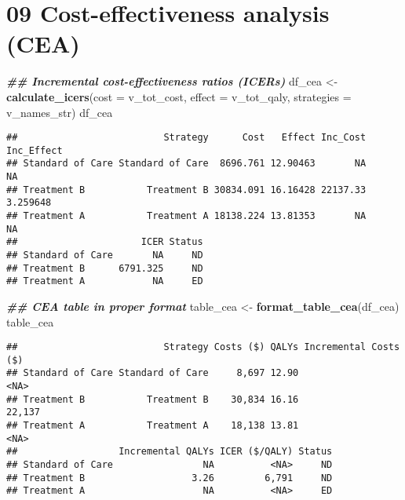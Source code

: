 \documentclass[
]{article}
\newenvironment{Shaded}{\begin{snugshade}}{\end{snugshade}}
\newcommand{\AttributeTok}[1]{\textcolor[rgb]{0.13,0.29,0.53}{#1}}
\newcommand{\DocumentationTok}[1]{\textcolor[rgb]{0.56,0.35,0.01}{\textbf{\textit{#1}}}}
\newcommand{\FunctionTok}[1]{\textcolor[rgb]{0.13,0.29,0.53}{\textbf{#1}}}
\newcommand{\NormalTok}[1]{#1}
\newcommand{\OtherTok}[1]{\textcolor[rgb]{0.56,0.35,0.01}{#1}}
\begin{document}
\hypertarget{cost-effectiveness-analysis-cea}{%
\section{09 Cost-effectiveness analysis
(CEA)}\label{cost-effectiveness-analysis-cea}}

\begin{Shaded}
\begin{Highlighting}[]
\DocumentationTok{\#\# Incremental cost{-}effectiveness ratios (ICERs) }
\NormalTok{df\_cea }\OtherTok{\textless{}{-}} \FunctionTok{calculate\_icers}\NormalTok{(}\AttributeTok{cost       =}\NormalTok{ v\_tot\_cost, }
                          \AttributeTok{effect     =}\NormalTok{ v\_tot\_qaly,}
                          \AttributeTok{strategies =}\NormalTok{ v\_names\_str)}
\NormalTok{df\_cea}
\end{Highlighting}
\end{Shaded}

\begin{verbatim}
##                          Strategy      Cost   Effect Inc_Cost Inc_Effect
## Standard of Care Standard of Care  8696.761 12.90463       NA         NA
## Treatment B           Treatment B 30834.091 16.16428 22137.33   3.259648
## Treatment A           Treatment A 18138.224 13.81353       NA         NA
##                      ICER Status
## Standard of Care       NA     ND
## Treatment B      6791.325     ND
## Treatment A            NA     ED
\end{verbatim}

\begin{Shaded}
\begin{Highlighting}[]
\DocumentationTok{\#\# CEA table in proper format }
\NormalTok{table\_cea }\OtherTok{\textless{}{-}} \FunctionTok{format\_table\_cea}\NormalTok{(df\_cea) }
\NormalTok{table\_cea}
\end{Highlighting}
\end{Shaded}

\begin{verbatim}
##                          Strategy Costs ($) QALYs Incremental Costs ($)
## Standard of Care Standard of Care     8,697 12.90                  <NA>
## Treatment B           Treatment B    30,834 16.16                22,137
## Treatment A           Treatment A    18,138 13.81                  <NA>
##                  Incremental QALYs ICER ($/QALY) Status
## Standard of Care                NA          <NA>     ND
## Treatment B                   3.26         6,791     ND
## Treatment A                     NA          <NA>     ED
\end{verbatim}
\end{document}
